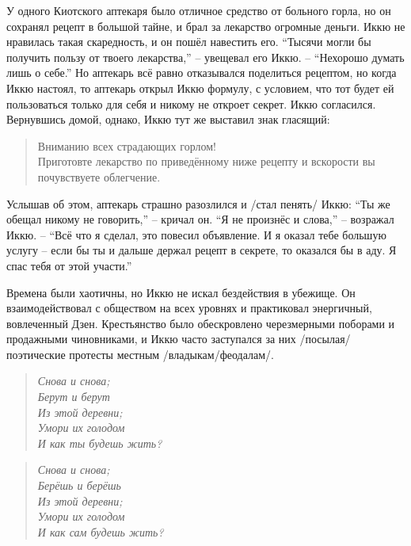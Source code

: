 \begin{ver}
У одного Киотского аптекаря было отличное средство от больного горла,
но он сохранял рецепт в большой тайне, и брал за лекарство огромные
деньги.
Иккю не нравилась такая скаредность, и он пошёл
навестить его.
``Тысячи могли бы получить пользу от твоего лекарства,'' -- увещевал
его Иккю. -- ``Нехорошо думать лишь о себе.'' Но аптекарь всё равно
отказывался поделиться рецептом, но когда Иккю настоял, то аптекарь
открыл Иккю формулу, с условием, что тот будет ей пользоваться только
для себя и никому не откроет секрет. Иккю согласился. Вернувшись
домой, однако, Иккю тут же выставил знак гласящий:
\end{ver}

\begin{ver}
  \begin{quote}
    Вниманию всех страдающих горлом!\\
    Приготовте лекарство по приведённому ниже рецепту и вскорости вы
    почувствуете облегчение.
  \end{quote}
\end{ver}

\begin{ver}
Услышав об этом, аптекарь страшно разозлился и /стал
пенять/ Иккю: ``Ты же обещал никому не говорить,'' --
кричал он. ``Я не произнёс и слова,'' -- возражал Иккю. -- ``Всё что я
сделал, это повесил объявление. И я оказал тебе большую услугу -- если
бы ты и дальше держал рецепт в секрете, то оказался бы в аду. Я спас
тебя от этой участи.'' 
\end{ver}

\begin{ver}
  Времена были хаотичны, но Иккю не искал бездействия в
  убежище.
  Он взаимодействовал с обществом на всех уровнях и практиковал
  энергичный, вовлеченный Дзен.
  Крестьянство было обескровлено черезмерными поборами и продажными
  чиновниками, и Иккю часто заступался за них /посылая/
  поэтические протесты местным /владыкам/феодалам/. 
\end{ver}


\begin{ver}
  \begin{verse}\it
    Снова и снова;\\
    Берут и берут\\
    Из этой деревни;\\
    Умори их голодом\\
    И как {\em ты} будешь жить?
  \end{verse}
\end{ver}

\begin{ver}[1]
  \begin{verse}\it
    Снова и снова;\\
    Берёшь и берёшь\\
    Из этой деревни;\\
    Умори их голодом\\
    И как {\em сам} будешь жить?
  \end{verse}
\end{ver}


